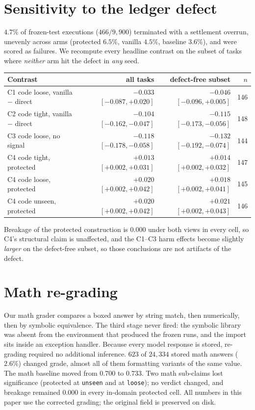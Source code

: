 \documentclass{article}
\begin{document}
\section{Sensitivity to the ledger defect}
\label{app:sensitivity}

$4.7\%$ of frozen-test executions ($466/9{,}900$) terminated with a settlement
overrun, unevenly across arms (protected $6.5\%$, vanilla $4.5\%$, baseline
$3.6\%$), and were scored as failures. We recompute every headline contrast on
the subset of tasks where \emph{neither} arm hit the defect in \emph{any} seed.

\begin{center}
\small
\begin{tabular}{lrrr}
\toprule
Contrast & all tasks & defect-free subset & $n$ \\
\midrule
C1 code loose, vanilla $-$ direct & $-0.033$ $[-0.087,+0.020]$ & $-0.046$ $[-0.096,+0.005]$ & 146 \\
C2 code tight, vanilla $-$ direct & $-0.104$ $[-0.162,-0.047]$ & $-0.115$ $[-0.173,-0.056]$ & 148 \\
C3 code loose, no signal & $-0.118$ $[-0.178,-0.058]$ & $-0.132$ $[-0.192,-0.074]$ & 144 \\
C4 code tight, protected & $+0.013$ $[+0.002,+0.031]$ & $+0.014$ $[+0.002,+0.032]$ & 147 \\
C4 code loose, protected & $+0.020$ $[+0.002,+0.042]$ & $+0.018$ $[+0.002,+0.041]$ & 145 \\
C4 code unseen, protected & $+0.020$ $[+0.002,+0.042]$ & $+0.021$ $[+0.002,+0.043]$ & 146 \\
\bottomrule
\end{tabular}
\end{center}

Breakage of the protected construction is $0.000$ under both views in every
cell, so C4's structural claim is unaffected, and the C1--C3 harm effects become
slightly \emph{larger} on the defect-free subset, so those conclusions are not
artifacts of the defect.

\section{Math re-grading}
\label{app:regrade}

Our math grader compares a boxed answer by string match, then numerically, then
by symbolic equivalence. The third stage never fired: the symbolic library was
absent from the environment that produced the frozen runs, and the import sits
inside an exception handler. Because every model response is stored, re-grading
required no additional inference. $623$ of $24{,}334$ stored math answers
($2.6\%$) changed grade, almost all of them formatting variants of the same
value. The math baseline moved from $0.700$ to $0.733$. Two math sub-claims lost
significance (protected at \texttt{unseen} and at \texttt{loose}); no verdict
changed, and breakage remained $0.000$ in every in-domain protected cell. All
numbers in this paper use the corrected grading; the original field is preserved
on disk.
\end{document}
